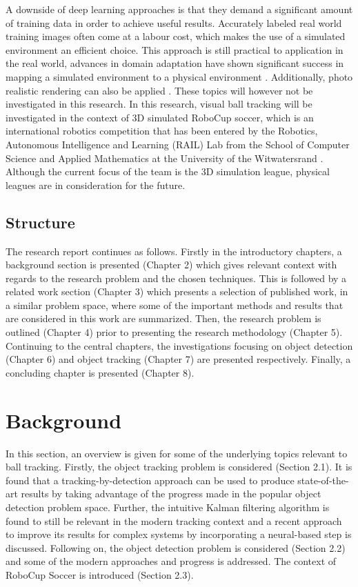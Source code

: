 \documentclass[a4paper,twoside,12pt]{report}
\begin{document}
A downside of deep learning approaches is that they demand a significant amount of training data in order to achieve useful results. Accurately labeled real world training images often come at a labour cost, which makes the use of a simulated environment an efficient choice. This approach is still practical to application  in the real world, advances in domain adaptation have shown significant success in mapping a simulated environment to a physical environment \citep{domainadpt}. Additionally, photo realistic rendering can also be applied \citep{sim4cv}. These topics will however not be investigated in this research. In this research, visual ball tracking will be investigated in the context of 3D simulated RoboCup soccer, which is an international robotics competition  that has been entered by the Robotics, Autonomous Intelligence and Learning (RAIL) Lab from the School of Computer Science and Applied Mathematics at the University of the Witwatersrand \citep{witsfc}. Although the current focus of the team is the 3D simulation league, physical leagues are in consideration for the future. 

\section{Structure}

The research report continues as follows. Firstly in the introductory chapters, a background section is presented (Chapter 2) which gives relevant context with regards to the research problem and the chosen techniques. This is followed by a related work section (Chapter 3) which presents a selection of published work, in a similar problem space, where some of the important methods and results that are considered in this work are summarized. Then, the research problem is outlined (Chapter 4) prior to presenting the research methodology (Chapter 5). Continuing to the central chapters, the investigations focusing on object detection (Chapter 6) and object tracking (Chapter 7) are presented respectively. Finally, a concluding chapter is presented (Chapter 8).

\chapter{Background}

In this section, an overview is given for some of the underlying topics relevant to ball tracking. Firstly, the object tracking problem is considered (Section 2.1). It is found that a tracking-by-detection approach can be used to produce state-of-the-art results by taking advantage of the progress made in the popular object detection problem space. Further, the intuitive Kalman filtering algorithm is found to still be relevant in the modern tracking context and a recent approach to improve its results for complex systems by incorporating a neural-based step is discussed. Following on, the object detection problem is considered  (Section 2.2) and some of the modern approaches and progress is addressed. The context of RoboCup Soccer is introduced (Section 2.3).
\end{document}
